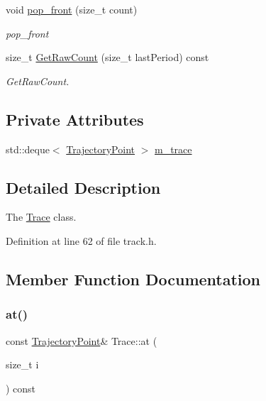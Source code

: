 \begin{DoxyCompactItemize}
\item 
void \mbox{\hyperlink{class_trace_a407c1b44333105aff314ae6f7f0ab7eb}{pop\+\_\+front}} (size\+\_\+t count)
\begin{DoxyCompactList}\small\item\em pop\+\_\+front \end{DoxyCompactList}\item 
size\+\_\+t \mbox{\hyperlink{class_trace_abef223bff681cc1165abfeb80c4f1267}{Get\+Raw\+Count}} (size\+\_\+t last\+Period) const
\begin{DoxyCompactList}\small\item\em Get\+Raw\+Count. \end{DoxyCompactList}\end{DoxyCompactItemize}
\subsection*{Private Attributes}
\begin{DoxyCompactItemize}
\item 
std\+::deque$<$ \mbox{\hyperlink{struct_trajectory_point}{Trajectory\+Point}} $>$ \mbox{\hyperlink{class_trace_a2650850103966a19b5cbac6db8df8b66}{m\+\_\+trace}}
\end{DoxyCompactItemize}


\subsection{Detailed Description}
The \mbox{\hyperlink{class_trace}{Trace}} class. 

Definition at line 62 of file track.\+h.



\subsection{Member Function Documentation}
\mbox{\label{class_trace_a275e31cde73ea1ba7f51c17191aefcd5}} 
\subsubsection{\texorpdfstring{at()}{at()}}
{\footnotesize\ttfamily const \mbox{\hyperlink{struct_trajectory_point}{Trajectory\+Point}}\& Trace\+::at (\begin{DoxyParamCaption}\item[{size\+\_\+t}]{i }\end{DoxyParamCaption}) const\hspace{0.3cm}{\ttfamily [inline]}}



